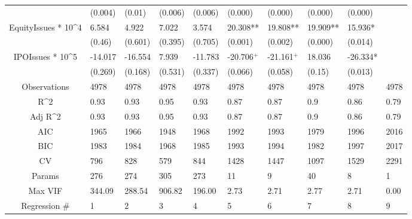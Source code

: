 \documentclass{article}
\begin{document}
\begin{table}[H]
\begin{tabular}{|clllllllll|}
   & (0.004) & (0.01) & (0.006) & (0.006) & (0.000) & (0.000) & (0.000) & (0.000) &  \\ 
  EquityIssues * 10^4 & 6.584 & 4.922 & 7.022 & 3.574 & 20.308** & 19.808** & 19.909** & 15.936* &  \\ 
   & (0.46) & (0.601) & (0.395) & (0.705) & (0.001) & (0.002) & (0.000) & (0.014) &  \\ 
  IPOIssues * 10^5 & -14.017 & -16.554 & 7.939 & -11.783 & -20.706$^{+}$ & -21.161$^{+}$ & 18.036 & -26.334* &  \\ 
   & (0.269) & (0.168) & (0.531) & (0.337) & (0.066) & (0.058) & (0.15) & (0.013) &  \\ 
  \hline 
 Observations & 4978 & 4978 & 4978 & 4978 & 4978 & 4978 & 4978 & 4978 & 4978 \\ 
  R^2 & 0.93 & 0.93 & 0.95 & 0.93 & 0.87 & 0.87 & 0.9 & 0.86 & 0.79 \\ 
  Adj R^2 & 0.93 & 0.93 & 0.95 & 0.93 & 0.87 & 0.87 & 0.9 & 0.86 & 0.79 \\ 
  AIC & 1965 & 1966 & 1948 & 1968 & 1992 & 1993 & 1979 & 1996 & 2016 \\ 
  BIC & 1983 & 1984 & 1968 & 1985 & 1993 & 1994 & 1982 & 1997 & 2017 \\ 
  CV & 796 & 828 & 579 & 844 & 1428 & 1447 & 1097 & 1529 & 2291 \\ 
  Params & 276 & 274 & 305 & 273 & 11 & 9 & 40 & 8 & 1 \\ 
  Max VIF & 344.09 & 288.54 & 906.82 & 196.00 & 2.73 & 2.71 & 2.77 & 2.71 & 0.00 \\ 
  Regression \# & 1 & 2 & 3 & 4 & 5 & 6 & 7 & 8 & 9 \\ 
   \hline
\end{tabular}
 
\end{table}
\end{document}
